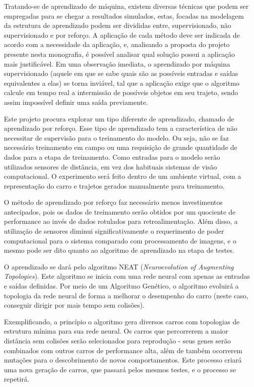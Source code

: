 Tratando-se de aprendizado de máquina, existem diversas técnicas que
podem ser empregadas para se chegar a resultados simulados, estas, focadas
na modelagem da estrutura de aprendizado podem ser divididas entre,
supervisionado, não supervisionado e por reforço. A aplicação de cada método
deve ser indicada de acordo com a necessidade da aplicação, e, analisando a
proposta do projeto presente nesta monografia, é possível analisar qual solução
possui a aplicação mais justificável. Em uma observação imediata, o
aprendizado por máquina supervisionado (aquele em que se sabe quais são as
possíveis entradas e saídas equivalentes a elas) se torna inviável, tal que a
aplicação exige que o algoritmo calcule em tempo real a intermissão de possíveis
objetos em seu trajeto, sendo assim impossível definir uma saída previamente.

Este projeto procura explorar um tipo diferente de aprendizado, chamado
de aprendizado por reforço. Esse tipo de aprendizado tem a característica de
não necessitar de supervisão para o treinamento do modelo. Ou seja, não se faz
necessário treinamento em campo ou uma requisição de grande quantidade de
dados para a etapa de treinamento. Como entradas para o modelo serão
utilizados sensores de distância, em vez dos habituais sistemas de visão
computacional. O experimento será feito dentro de um ambiente virtual, com a
representação do carro e trajetos gerados manualmente para treinamento.

O método de aprendizado por reforço faz necessário menos investimentos
antecipados, pois os dados de treinamento serão obtidos por um quociente de
performance ao invés de dados rotulados para retroalimentação. Além disso, a
utilização de sensores diminui significativamente o requerimento de poder
computacional para o sistema comparado com processamento de imagens, e o
mesmo pode ser dito quanto ao algoritmo de aprendizado na etapa de testes.

O aprendizado se dará pelo algoritmo NEAT (\textit{Neuroevolution of
Augmenting Topologies}). Este algoritmo se inicia com uma rede neural com
apenas as entradas e saídas definidas. Por meio de um Algoritmo Genético, o
algoritmo evoluirá a topologia da rede neural de forma a melhorar o desempenho
do carro (neste caso, conseguir dirigir por mais tempo sem colisões).

Exemplificando, a princípio o algoritmo gera diversos carros com topologias
de estrutura mínima para sua rede neural. Os carros que percorrerem a maior 
distância sem colisões serão selecionados para reprodução - seus genes serão 
combinados com outros carros de performance alta, além de também ocorrerem mutações
para o descobrimento de novos comportamentos. Este processo criará uma nova
geração de carros, que passará pelos mesmos testes, e o processo se repetirá.

